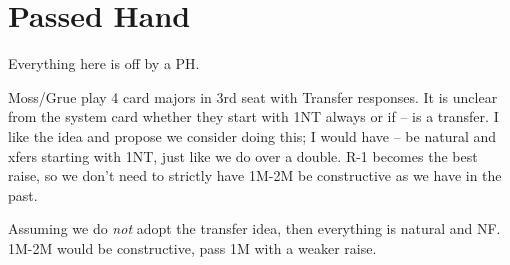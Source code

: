 \documentclass[tom-ari]{subfile}
\begin{document}
	\section{Passed Hand}
	
	
	Everything here is off by a PH.  
	
	Moss/Grue play 4 card majors in 3rd seat with Transfer responses.  It is unclear from the system card whether they start with 1NT always or if -- is a transfer.  I like the idea and propose we consider doing this; I would have -- be natural and xfers starting with 1NT, just like we do over a double. R-1 becomes the best raise, so we don't need to strictly have 1M-2M be constructive as we have in the past.
	
	Assuming we do \textit{not} adopt the transfer idea, then everything is natural and NF. 1M-2M would be constructive, pass 1M with a weaker raise.
	  
\end{document}
